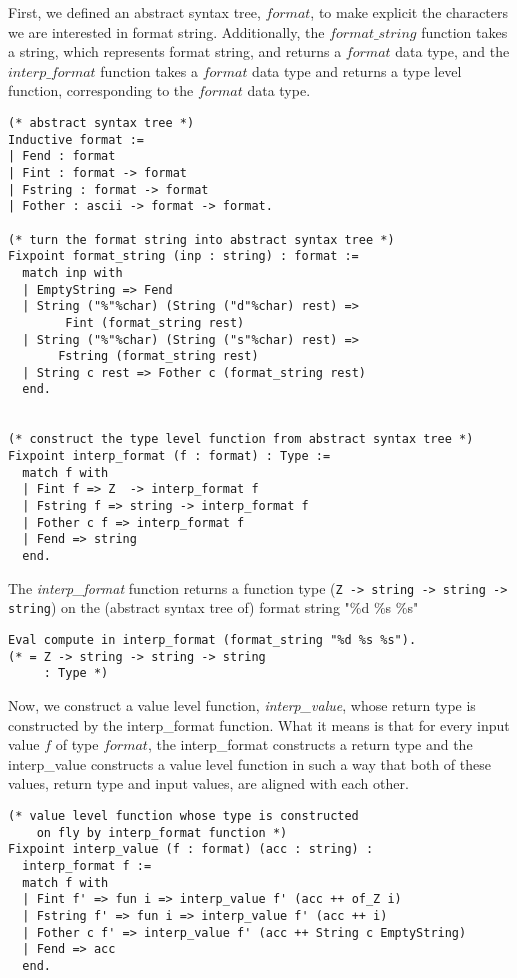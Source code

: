 First, we defined an abstract syntax tree,  $format$, to make explicit the characters we 
are interested in format string. Additionally, the $format\_string$ function takes a string, which represents format string, 
and returns a $format$ data type, and the  $interp\_format$ function takes a $format$ data type
and returns a type level function, corresponding to the $format$ data type.

\begin{verbatim}
(* abstract syntax tree *)
Inductive format :=
| Fend : format
| Fint : format -> format
| Fstring : format -> format
| Fother : ascii -> format -> format.

(* turn the format string into abstract syntax tree *)
Fixpoint format_string (inp : string) : format :=
  match inp with
  | EmptyString => Fend
  | String ("%"%char) (String ("d"%char) rest) => 
        Fint (format_string rest)
  | String ("%"%char) (String ("s"%char) rest) => 
       Fstring (format_string rest)
  | String c rest => Fother c (format_string rest)
  end.


(* construct the type level function from abstract syntax tree *)
Fixpoint interp_format (f : format) : Type :=
  match f with
  | Fint f => Z  -> interp_format f
  | Fstring f => string -> interp_format f
  | Fother c f => interp_format f
  | Fend => string
  end.
\end{verbatim}


\noindent
The \textit{interp\_format} function returns a function type 
(\texttt{Z -> string -> string -> string})  on the (abstract syntax tree of) 
format string "\%d \%s \%s" 

\begin{verbatim}
Eval compute in interp_format (format_string "%d %s %s").
(* = Z -> string -> string -> string
     : Type *)
\end{verbatim}

Now, we construct a value level function, \textit{interp\_value}, whose return 
type is constructed by the interp\_format function. 
What it means is that for every input value $f$ of type $format$,  the 
interp\_format  constructs a return type and 
the  interp\_value constructs a value level function in 
such a way that both of these values, return type  and  input values,  are
aligned with each other.   

\begin{verbatim}
(* value level function whose type is constructed 
    on fly by interp_format function *)
Fixpoint interp_value (f : format) (acc : string) : 
  interp_format f :=
  match f with
  | Fint f' => fun i => interp_value f' (acc ++ of_Z i)
  | Fstring f' => fun i => interp_value f' (acc ++ i)
  | Fother c f' => interp_value f' (acc ++ String c EmptyString)
  | Fend => acc
  end.
\end{verbatim}

